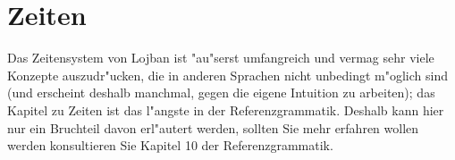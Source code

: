 \section{Zeiten}
Das Zeitensystem von Lojban ist "au"serst umfangreich und vermag sehr viele Konzepte auszudr"ucken, die in anderen Sprachen nicht unbedingt
m"oglich sind (und erscheint deshalb manchmal, gegen die eigene Intuition zu arbeiten); das Kapitel zu Zeiten ist das l"angste in der
Referenzgrammatik. Deshalb kann hier nur ein Bruchteil davon erl"autert werden, sollten Sie mehr erfahren wollen werden konsultieren Sie Kapitel
10 der Referenzgrammatik.
